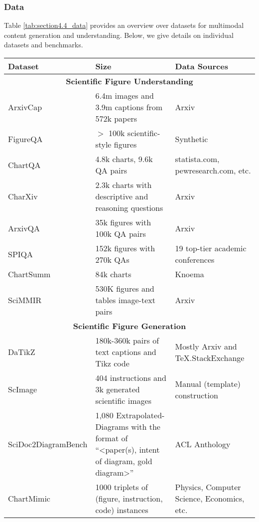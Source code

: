 \subsubsection{Data}

Table \ref{tab:section4.4_data} %
provides an overview over datasets %
for multimodal content generation and understanding. Below, we give details on individual datasets and benchmarks. 

\begin{table}[t]
\begin{small}
    \begin{tabular}{p{3cm}|p{6cm}|p{5cm}} %
        \toprule
      \textbf{Dataset} & \textbf{Size} & \textbf{Data Sources}  %
      \\
    \midrule  
     \multicolumn{3}{c}{\textbf{Scientific Figure Understanding}} \\ \hline
ArxivCap \cite{li-etal-2024-multimodal-arxiv} & 6.4m images and 3.9m captions from 572k papers & Arxiv \\ 
FigureQA \cite{ebrahimi2018figureqa} & $>$ 100k scientific-style figures& Synthetic\\
ChartQA \cite{masry-etal-2022-chartqa} & 4.8k charts, 9.6k QA pairs& statista.com, pewresearch.com, etc. \\ %
CharXiv \cite{wang2024charxiv} & 2.3k charts with descriptive and reasoning questions& Arxiv\\
ArxivQA \cite{li-etal-2024-multimodal-arxiv} & 35k figures with 100k QA pairs& Arxiv\\
SPIQA \cite{pramanick2024spiqa} & 152k figures with 270k QAs & 19 top-tier academic conferences\\
ChartSumm \cite{xu2024chartadapterlargevisionlanguagemodel} & 84k charts & Knoema\\ 
SciMMIR\cite{wu-etal-2024-scimmir} & 530K  figures and tables image-text pairs & Arxiv \\
\hline
 \multicolumn{3}{c}{\textbf{Scientific Figure Generation}} \\ \hline
DaTikZ \cite{belouadi2024automatikz,belouadi2024detikzify} & 180k-360k pairs of text captions and Tikz code & Mostly Arxiv and TeX.StackExchange \\
ScImage \cite{zhang2024scimagegoodmultimodallarge} & 404 instructions and 3k generated scientific images & Manual (template) construction \\
SciDoc2DiagramBench \cite{mondal-etal-2024-scidoc2diagrammer} & 1,080 Extrapolated-Diagrams with the format of ``<paper(s), intent of diagram, gold diagram>'' & ACL Anthology \\ 
ChartMimic \citep{shi2024chartmimicevaluatinglmmscrossmodal} & 1000 triplets of (figure, instruction, code) instances & Physics, Computer Science, Economics, etc.\\
\hline


\end{tabular}
\end{small}
\end{table}
